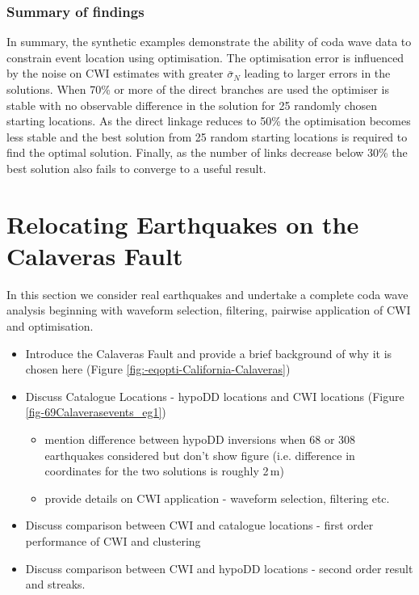 \documentclass[extra]{gji}
\begin{document}
\subsubsection{Summary of findings}

In summary, the synthetic examples demonstrate the ability of coda wave data to constrain event location
using optimisation. The optimisation error is influenced by the
noise on CWI estimates with greater $\bar{\sigma}_N$ leading to larger
errors in the solutions. When 70\% or more of the direct branches are used the
optimiser is stable with no observable difference in the solution for 25 randomly chosen starting
locations. As the direct linkage reduces to 50\% the optimisation becomes less stable and the best solution
from 25 random starting locations is required to find the optimal solution. Finally, as the number of links decrease
below 30\% the best solution also fails to converge to a useful result.


\section{Relocating Earthquakes on the Calaveras Fault}
\label{sec:CalaverasLoc-CWIonly}

In this section we consider real
earthquakes and undertake a complete coda wave analysis beginning with waveform selection, filtering, pairwise application
of CWI and optimisation.
\begin{itemize}
\item Introduce the Calaveras Fault and provide a brief background of why it is chosen here (Figure \ref{fig:-eqopti-California-Calaveras})
\item Discuss Catalogue Locations - hypoDD locations and CWI locations
(Figure \ref{fig-69Calaverasevents_eg1})
\begin{itemize}
\item mention difference between hypoDD inversions when 68 or
308 earthquakes considered but don't show figure (i.e. difference in coordinates for
the two solutions is roughly 2\,m)
\item provide details on CWI application - waveform selection, filtering etc.
\end{itemize}
\item Discuss comparison between CWI and catalogue locations - first order performance of CWI and clustering
\item Discuss comparison between CWI and hypoDD locations - second order result and streaks.
\end{itemize}
\end{document}
